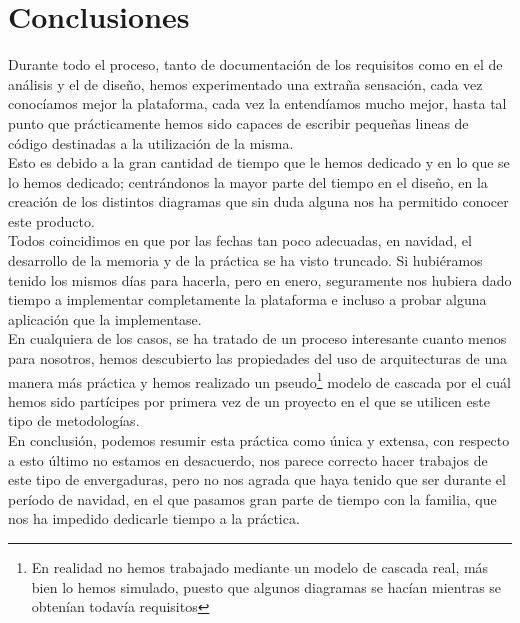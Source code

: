 \chapter{Conclusiones}
\lettrine[lines=1,slope=4pt,findent=0pt]{D}{}urante todo el proceso, tanto de documentación de los requisitos como en el de análisis y el de diseño, hemos experimentado una extraña sensación, cada vez conocíamos mejor la plataforma, cada vez la entendíamos mucho mejor, hasta tal punto que prácticamente hemos sido capaces de escribir pequeñas lineas de código destinadas a la utilización de la misma.\\

Esto es debido a la gran cantidad de tiempo que le hemos dedicado y en lo que se lo hemos dedicado; centrándonos la mayor parte del tiempo en el diseño, en la creación de los distintos diagramas que sin duda alguna nos ha permitido conocer este producto.\\

Todos coincidimos en que por las fechas tan poco adecuadas, en navidad, el desarrollo de la memoria y de la práctica se ha visto truncado. Si hubiéramos tenido los mismos días para hacerla, pero en enero, seguramente nos hubiera dado tiempo a implementar completamente la plataforma e incluso a probar alguna aplicación que la implementase.\\

En cualquiera de los casos, se ha tratado de un proceso interesante cuanto menos para nosotros, hemos descubierto las propiedades del uso de arquitecturas de una manera más práctica y hemos realizado un pseudo\footnote{En realidad no hemos trabajado mediante un modelo de cascada real, más bien lo hemos simulado, puesto que algunos diagramas se hacían mientras se obtenían todavía requisitos} modelo de cascada por el cuál hemos sido partícipes por primera vez de un proyecto en el que se utilicen este tipo de metodologías.\\

En conclusión, podemos resumir esta práctica como única y extensa, con respecto a esto último no estamos en desacuerdo, nos parece correcto hacer trabajos de este tipo de envergaduras, pero no nos agrada que haya tenido que ser durante el período de navidad, en el que pasamos gran parte de tiempo con la familia, que nos ha impedido dedicarle tiempo a la práctica.